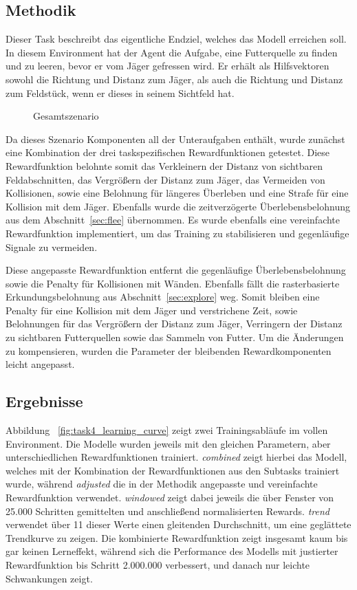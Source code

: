 \subsection{Methodik}
Dieser Task beschreibt das eigentliche Endziel, welches das Modell erreichen soll. In diesem Environment hat der Agent die Aufgabe, eine Futterquelle zu finden und zu leeren, bevor er vom Jäger gefressen wird. Er erhält als Hilfsvektoren sowohl die Richtung und Distanz zum Jäger, als auch die Richtung und Distanz zum Feldstück, wenn er dieses in seinem Sichtfeld hat. 
\begin{figure}[htbp]
  \centering
  \caption{Gesamtszenario}
  \label{fig:full_scenario}
\end{figure}
Da dieses Szenario Komponenten all der Unteraufgaben enthält, wurde zunächst eine Kombination der drei taskspezifischen Rewardfunktionen getestet. Diese Rewardfunktion belohnte somit das Verkleinern der Distanz von sichtbaren Feldabschnitten, das Vergrößern der Distanz zum Jäger, das Vermeiden von Kollisionen, sowie eine Belohnung für längeres Überleben und eine Strafe für eine Kollision mit dem Jäger. Ebenfalls wurde die zeitverzögerte Überlebensbelohnung aus dem Abschnitt~\ref{sec:flee} übernommen. Es wurde ebenfalls eine vereinfachte Rewardfunktion implementiert, um das Training zu stabilisieren und gegenläufige Signale zu vermeiden.

Diese angepasste Rewardfunktion entfernt die gegenläufige Überlebensbelohnung sowie die Penalty für Kollisionen mit Wänden. Ebenfalls fällt die rasterbasierte Erkundungsbelohnung aus Abschnitt~\ref{sec:explore} weg. Somit bleiben eine Penalty für eine Kollision mit dem Jäger und verstrichene Zeit, sowie Belohnungen für das Vergrößern der Distanz zum Jäger, Verringern der Distanz zu sichtbaren Futterquellen sowie das Sammeln von Futter. Um die Änderungen zu kompensieren, wurden die Parameter der bleibenden Rewardkomponenten leicht angepasst.

\subsection{Ergebnisse}
Abbildung ~\ref{fig:task4_learning_curve} zeigt zwei Trainingsabläufe im vollen Environment. Die Modelle wurden jeweils mit den gleichen Parametern, aber unterschiedlichen Rewardfunktionen trainiert. \emph{combined} zeigt hierbei das Modell, welches mit der Kombination der Rewardfunktionen aus den Subtasks trainiert wurde, während \emph{adjusted} die in der Methodik angepasste und vereinfachte Rewardfunktion verwendet. \emph{windowed} zeigt dabei jeweils die über Fenster von 25.000 Schritten gemittelten und anschließend normalisierten Rewards. \emph{trend} verwendet über 11 dieser Werte einen gleitenden Durchschnitt, um eine geglättete Trendkurve zu zeigen. Die kombinierte Rewardfunktion zeigt insgesamt kaum bis gar keinen Lerneffekt, während sich die Performance des Modells mit justierter Rewardfunktion bis Schritt 2.000.000 verbessert, und danach nur leichte Schwankungen zeigt.

